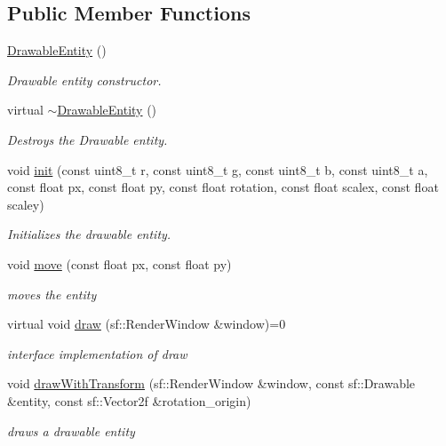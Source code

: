 \subsection*{Public Member Functions}
\begin{DoxyCompactItemize}
\item 
\hyperlink{class_drawable_entity_a8e9f9afa7c76fdc19e27ca0975ffcb21}{Drawable\+Entity} ()
\begin{DoxyCompactList}\small\item\em Drawable entity constructor. \end{DoxyCompactList}\item 
virtual \hyperlink{class_drawable_entity_af688295ed4873a01b32862c3c0241933}{$\sim$\+Drawable\+Entity} ()
\begin{DoxyCompactList}\small\item\em Destroys the Drawable entity. \end{DoxyCompactList}\item 
void \hyperlink{class_drawable_entity_a3893879bf0710a7f5c5e7eb758ad7e96}{init} (const uint8\+\_\+t r, const uint8\+\_\+t g, const uint8\+\_\+t b, const uint8\+\_\+t a, const float px, const float py, const float rotation, const float scalex, const float scaley)
\begin{DoxyCompactList}\small\item\em Initializes the drawable entity. \end{DoxyCompactList}\item 
void \hyperlink{class_drawable_entity_a016d3d0cc80f9834918de44e0adb19fb}{move} (const float px, const float py)
\begin{DoxyCompactList}\small\item\em moves the entity \end{DoxyCompactList}\item 
virtual void \hyperlink{class_drawable_entity_a0b0db9c1325defed216d66a5b4cc755e}{draw} (sf\+::\+Render\+Window \&window)=0
\begin{DoxyCompactList}\small\item\em interface implementation of draw \end{DoxyCompactList}\item 
void \hyperlink{class_drawable_entity_a41ad5dfa5e9a5c366e05ba28bb469557}{draw\+With\+Transform} (sf\+::\+Render\+Window \&window, const sf\+::\+Drawable \&entity, const sf\+::\+Vector2f \&rotation\+\_\+origin)
\begin{DoxyCompactList}\small\item\em draws a drawable entity \end{DoxyCompactList}\item 

\end{DoxyCompactItemize}
